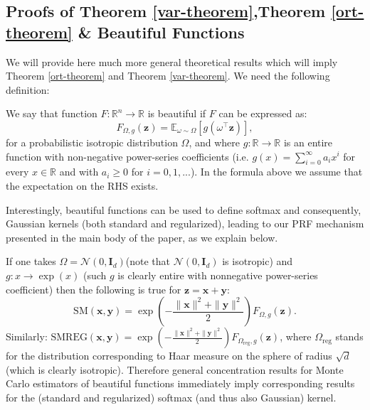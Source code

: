 \subsection{Proofs of Theorem \ref{var-theorem},Theorem \ref{ort-theorem} \& Beautiful Functions}

We will provide here much more general theoretical results which will imply  Theorem \ref{ort-theorem} and Theorem \ref{var-theorem}. We need the following definition:

\begin{definition}
\label{beauty-definition}
We say that function $F:\mathbb{R}^{n} \rightarrow \mathbb{R}$ is beautiful if $F$ can be expressed as:
\begin{equation}
F_{\Omega,g}(\mathbf{z}) = 
\mathbb{E}_{\omega \sim \Omega}[g(\omega^{\top}\mathbf{z})], 
\end{equation}
for a probabilistic isotropic distribution $\Omega$, and where $g:\mathbb{R} \rightarrow \mathbb{R}$ is an entire function
with non-negative power-series coefficients 
(i.e. $g(x) = \sum_{i=0}^{\infty} a_{i}x^{i}$ for every $x \in \mathbb{R}$ and with $a_{i} \geq 0$ for $i=0,1,...$).
In the formula above we assume that the expectation on the RHS exists.
\end{definition}

Interestingly, beautiful functions can be used to define softmax and consequently, Gaussian kernels (both standard and regularized), leading to our PRF mechanism presented in the main body of the paper, as we explain below.

\begin{remark}
\label{imp_remark}
If one takes $\Omega = \mathcal{N}(0,\mathbf{I}_{d})$(note that $\mathcal{N}(0, \mathbf{I}_{d})$ is isotropic) and $g: x \rightarrow \exp(x)$ (such $g$ is clearly entire with nonnegative power-series coefficient) then the following is true for $\mathbf{z} = \mathbf{x}+\mathbf{y}$:
\begin{equation}
\label{beauty_to_sm}
\mathrm{SM}(\mathbf{x}, \mathbf{y}) = \exp(-\frac{\|\mathbf{x}\|^{2}+\|\mathbf{y}\|^{2}}{2})F_{\Omega,g}(\mathbf{z}).   
\end{equation}
Similarly: $\mathrm{SMREG}(\mathbf{x}, \mathbf{y}) = \exp(-\frac{\|\mathbf{x}\|^{2}+\|\mathbf{y}\|^{2}}{2})F_{\Omega_{\mathrm{reg}},g}(\mathbf{z})$, where $\Omega_{\mathrm{reg}}$ stands for the distribution corresponding to Haar measure on the sphere of radius $\sqrt{d}$ (which is clearly isotropic). 
Therefore general concentration results for Monte Carlo estimators of beautiful functions immediately imply corresponding results for the (standard and regularized) softmax (and thus also Gaussian) kernel.
\end{remark}


